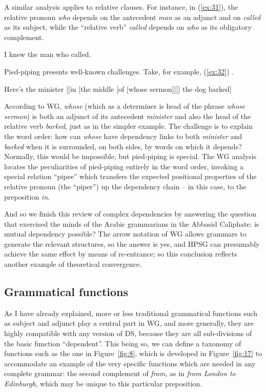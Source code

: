 \documentclass[output=paper
	        ,collection
	        ,collectionchapter
 	        ,biblatex
                ,babelshorthands
                ,newtxmath
                ,draftmode
                ,colorlinks, citecolor=brown
]{./langsci/langscibook}
\begin{document}
A similar analysis applies to relative clauses. For instance, in (\ref{ex:31}), the relative pronoun \emph{who} depends on the antecedent \emph{man} as an adjunct and on \emph{called} as its subject, while the ``relative verb'' \emph{called} depends on \emph{who} as its obligatory complement.

\begin{exe}
	\ex \label{ex:31} I knew the man who called.
\end{exe}

Pied-piping presents well-known challenges. Take, for example, (\ref{ex:32}) \citep[212]{ps2}.

\begin{exe}
	\ex \label{ex:32} Here’s the minister [[in [the middle [of [whose sermon]]]] the dog barked]
\end{exe}

According to WG, \emph{whose} (which as a determiner is head of the phrase \emph{whose sermon}) is both an adjunct of its antecedent \emph{minister} and also the head of the relative verb \emph{barked}, just as in the simpler example. The challenge is to explain the word order: how can \emph{whose} have dependency links to both \emph{minister} and \emph{barked} when it is surrounded, on both sides, by words on which it depends? Normally, this would be impossible, but pied-piping is special. The WG analysis \citep{Hudson2018a} locates the peculiarities of pied-piping entirely in the word order, invoking a special relation ``pipee'' which transfers the expected positional properties of the relative pronoun (the ``piper'') up the dependency chain – in this case, to the preposition \emph{in}.

And so we finish this review of complex dependencies by answering the question that exercised the minds of the Arabic grammarians in the Abbasid Ca\-liph\-ate: is mutual dependency possible? The arrow notation of WG allows grammars to generate the relevant structures, so the answer is yes, and HPSG can presumably achieve the same effect by means of re-entrance; so this conclusion reflects another example of theoretical convergence.


\subsection{Grammatical functions}
\label{sec:5.3}

As I have already explained, more or less traditional grammatical functions such as subject and adjunct play a central part in WG, and more generally, they are highly compatible with any version of DS, because they are all sub-divisions of the basic function ``dependent''. This being so, we can define a taxonomy of functions such as the one in Figure~\ref{fig:8}, which is developed in Figure~\ref{fig:17} to accommodate an example of the very specific functions which are needed in any complete grammar: the second complement of \emph{from}, as in \emph{from London to Edinburgh}, which may be unique to this particular preposition.
\end{document}
